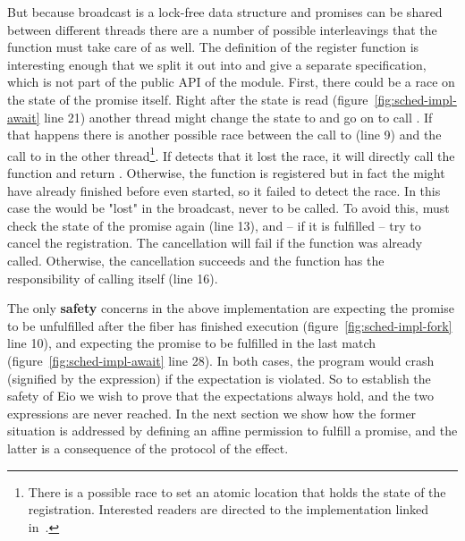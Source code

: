 But because broadcast is a lock-free data structure and promises can be shared between different threads there are a number of possible interleavings that the  function must take care of as well.
The definition of the register function is interesting enough that we split it out into  and give a separate specification, which is not part of the public API of the module.
First, there could be a race on the state of the promise itself.
Right after the state is read (figure~\ref{fig:sched-impl-await} line 21) another thread might change the state to  and go on to call .
If that happens there is another possible race between the call to  (line 9) and the call to  in the other thread\footnote{There is a possible race to set an atomic location that holds the state of the registration. Interested readers are directed to the implementation linked in~\cite{koval2023cqs}.}.
If  detects that it lost the race, it will directly call the  function and return .
Otherwise, the  function is registered but in fact the  might have already finished before  even started, so it failed to detect the race.
In this case the  would be "lost" in the broadcast, never to be called.
To avoid this,  must check the state of the promise again (line 13), and -- if it is fulfilled -- try to cancel the  registration.
The cancellation will fail if the  function was already called.
Otherwise, the cancellation succeeds and the  function has the responsibility of calling  itself (line 16).

The only \textbf{safety} concerns in the above implementation are  expecting the promise to be unfulfilled after the fiber has finished execution (figure~\ref{fig:sched-impl-fork} line 10),
and  expecting the promise to be fulfilled in the last match (figure~\ref{fig:sched-impl-await} line 28).
In both cases, the program would crash (signified by the  expression) if the expectation is violated.
So to establish the safety of Eio we wish to prove that the expectations always hold, and the two  expressions are never reached.
In the next section we show how the former situation is addressed by defining an affine permission to fulfill a promise, and the latter is a consequence of the protocol of the \esuspend{} effect.

